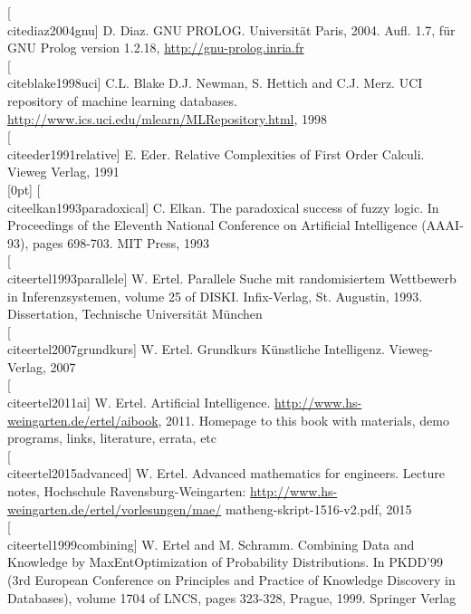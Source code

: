 \documentclass[10pt]{book}
\begin{document}
[\\cite{diaz2004gnu}] D. Diaz. GNU PROLOG. Universität Paris, 2004. Aufl. 1.7, für GNU Prolog version 1.2.18, \href{http://gnu-prolog.inria.fr}{http://gnu-prolog.inria.fr}\\[0pt]
[\\cite{blake1998uci}] C.L. Blake D.J. Newman, S. Hettich and C.J. Merz. UCI repository of machine learning databases. \href{http://www.ics.uci.edu/mlearn/MLRepository.html}{http://www.ics.uci.edu/mlearn/MLRepository.html}, 1998\\[0pt]
[\\cite{eder1991relative}] E. Eder. Relative Complexities of First Order Calculi. Vieweg Verlag, 1991\\
[0pt]
[\\cite{elkan1993paradoxical}] C. Elkan. The paradoxical success of fuzzy logic. In Proceedings of the Eleventh National Conference on Artificial Intelligence (AAAI-93), pages 698-703. MIT Press, 1993\\[0pt]
[\\cite{ertel1993parallele}] W. Ertel. Parallele Suche mit randomisiertem Wettbewerb in Inferenzsystemen, volume 25 of DISKI. Infix-Verlag, St. Augustin, 1993. Dissertation, Technische Universität München\\[0pt]
[\\cite{ertel2007grundkurs}] W. Ertel. Grundkurs Künstliche Intelligenz. Vieweg-Verlag, 2007\\[0pt]
[\\cite{ertel2011ai}] W. Ertel. Artificial Intelligence. \href{http://www.hs-weingarten.de/ertel/aibook}{http://www.hs-weingarten.de/ertel/aibook}, 2011. Homepage to this book with materials, demo programs, links, literature, errata, etc\\[0pt]
[\\cite{ertel2015advanced}] W. Ertel. Advanced mathematics for engineers. Lecture notes, Hochschule Ravensburg-Weingarten: \href{http://www.hs-weingarten.de/ertel/vorlesungen/mae/}{http://www.hs-weingarten.de/ertel/vorlesungen/mae/} matheng-skript-1516-v2.pdf, 2015\\[0pt]
[\\cite{ertel1999combining}] W. Ertel and M. Schramm. Combining Data and Knowledge by MaxEntOptimization of Probability Distributions. In PKDD'99 (3rd European Conference on Principles and Practice of Knowledge Discovery in Databases), volume 1704 of LNCS, pages 323-328, Prague, 1999. Springer Verlag\\[0pt]
\end{document}
